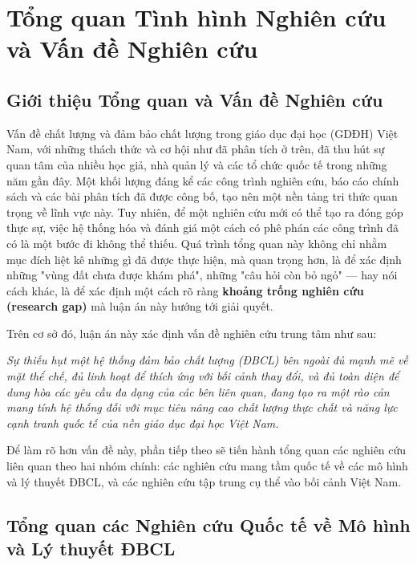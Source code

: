 \documentclass[12pt, a4paper, openany]{report}
\begin{document}


\section{Tổng quan Tình hình Nghiên cứu và Vấn đề Nghiên cứu}
\label{sec:tong_quan_nghien_cuu}

\subsection{Giới thiệu Tổng quan và Vấn đề Nghiên cứu}

Vấn đề chất lượng và đảm bảo chất lượng trong giáo dục đại học (GDĐH) Việt Nam, với những thách thức và cơ hội như đã phân tích ở trên, đã thu hút sự quan tâm của nhiều học giả, nhà quản lý và các tổ chức quốc tế trong những năm gần đây. Một khối lượng đáng kể các công trình nghiên cứu, báo cáo chính sách và các bài phân tích đã được công bố, tạo nên một nền tảng tri thức quan trọng về lĩnh vực này. Tuy nhiên, để một nghiên cứu mới có thể tạo ra đóng góp thực sự, việc hệ thống hóa và đánh giá một cách có phê phán các công trình đã có là một bước đi không thể thiếu. Quá trình tổng quan này không chỉ nhằm mục đích liệt kê những gì đã được thực hiện, mà quan trọng hơn, là để xác định những "vùng đất chưa được khám phá", những "câu hỏi còn bỏ ngỏ" — hay nói cách khác, là để xác định một cách rõ ràng \textbf{khoảng trống nghiên cứu (research gap)} mà luận án này hướng tới giải quyết.

Trên cơ sở đó, luận án này xác định vấn đề nghiên cứu trung tâm như sau:

\begin{center}
\textit{Sự thiếu hụt một hệ thống đảm bảo chất lượng (ĐBCL) bên ngoài đủ mạnh mẽ về mặt thể chế, đủ linh hoạt để thích ứng với bối cảnh thay đổi, và đủ toàn diện để dung hòa các yêu cầu đa dạng của các bên liên quan, đang tạo ra một rào cản mang tính hệ thống đối với mục tiêu nâng cao chất lượng thực chất và năng lực cạnh tranh quốc tế của nền giáo dục đại học Việt Nam.}
\end{center}

Để làm rõ hơn vấn đề này, phần tiếp theo sẽ tiến hành tổng quan các nghiên cứu liên quan theo hai nhóm chính: các nghiên cứu mang tầm quốc tế về các mô hình và lý thuyết ĐBCL, và các nghiên cứu tập trung cụ thể vào bối cảnh Việt Nam.

\subsection{Tổng quan các Nghiên cứu Quốc tế về Mô hình và Lý thuyết ĐBCL}
\end{document}
